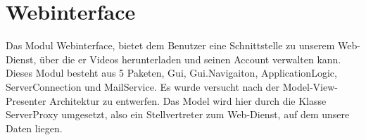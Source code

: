 \section{Webinterface}
Das Modul Webinterface, bietet dem Benutzer eine Schnittstelle zu unserem Web-Dienst, über die er Videos herunterladen und seinen Account verwalten kann. Dieses Modul besteht aus 5 Paketen, Gui, Gui.Navigaiton, ApplicationLogic, ServerConnection und MailService. Es wurde versucht nach der Model-View-Presenter Architektur zu entwerfen. Das Model wird hier durch die Klasse ServerProxy umgesetzt, also ein Stellvertreter zum Web-Dienst, auf dem unsere Daten liegen.
\newpage

\newpage

\newpage

\newpage

\newpage

\newpage

%
